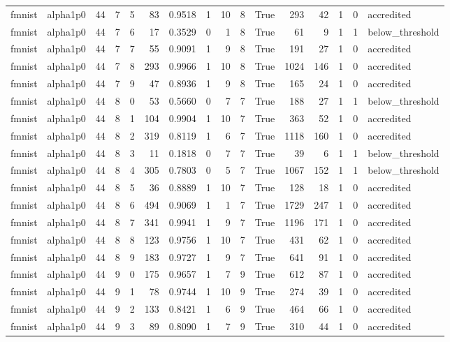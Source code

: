 \begin{tabular}{llrrrrrrrrrrrrrl}
fmnist & alpha1p0 & 44 & 7 & 5 & 83 & 0.9518 & 1 & 10 & 8 & True & 293 & 42 & 1 & 0 & accredited \\
fmnist & alpha1p0 & 44 & 7 & 6 & 17 & 0.3529 & 0 & 1 & 8 & True & 61 & 9 & 1 & 1 & below\_threshold \\
fmnist & alpha1p0 & 44 & 7 & 7 & 55 & 0.9091 & 1 & 9 & 8 & True & 191 & 27 & 1 & 0 & accredited \\
fmnist & alpha1p0 & 44 & 7 & 8 & 293 & 0.9966 & 1 & 10 & 8 & True & 1024 & 146 & 1 & 0 & accredited \\
fmnist & alpha1p0 & 44 & 7 & 9 & 47 & 0.8936 & 1 & 9 & 8 & True & 165 & 24 & 1 & 0 & accredited \\
fmnist & alpha1p0 & 44 & 8 & 0 & 53 & 0.5660 & 0 & 7 & 7 & True & 188 & 27 & 1 & 1 & below\_threshold \\
fmnist & alpha1p0 & 44 & 8 & 1 & 104 & 0.9904 & 1 & 10 & 7 & True & 363 & 52 & 1 & 0 & accredited \\
fmnist & alpha1p0 & 44 & 8 & 2 & 319 & 0.8119 & 1 & 6 & 7 & True & 1118 & 160 & 1 & 0 & accredited \\
fmnist & alpha1p0 & 44 & 8 & 3 & 11 & 0.1818 & 0 & 7 & 7 & True & 39 & 6 & 1 & 1 & below\_threshold \\
fmnist & alpha1p0 & 44 & 8 & 4 & 305 & 0.7803 & 0 & 5 & 7 & True & 1067 & 152 & 1 & 1 & below\_threshold \\
fmnist & alpha1p0 & 44 & 8 & 5 & 36 & 0.8889 & 1 & 10 & 7 & True & 128 & 18 & 1 & 0 & accredited \\
fmnist & alpha1p0 & 44 & 8 & 6 & 494 & 0.9069 & 1 & 1 & 7 & True & 1729 & 247 & 1 & 0 & accredited \\
fmnist & alpha1p0 & 44 & 8 & 7 & 341 & 0.9941 & 1 & 9 & 7 & True & 1196 & 171 & 1 & 0 & accredited \\
fmnist & alpha1p0 & 44 & 8 & 8 & 123 & 0.9756 & 1 & 10 & 7 & True & 431 & 62 & 1 & 0 & accredited \\
fmnist & alpha1p0 & 44 & 8 & 9 & 183 & 0.9727 & 1 & 9 & 7 & True & 641 & 91 & 1 & 0 & accredited \\
fmnist & alpha1p0 & 44 & 9 & 0 & 175 & 0.9657 & 1 & 7 & 9 & True & 612 & 87 & 1 & 0 & accredited \\
fmnist & alpha1p0 & 44 & 9 & 1 & 78 & 0.9744 & 1 & 10 & 9 & True & 274 & 39 & 1 & 0 & accredited \\
fmnist & alpha1p0 & 44 & 9 & 2 & 133 & 0.8421 & 1 & 6 & 9 & True & 464 & 66 & 1 & 0 & accredited \\
fmnist & alpha1p0 & 44 & 9 & 3 & 89 & 0.8090 & 1 & 7 & 9 & True & 310 & 44 & 1 & 0 & accredited \\

\end{tabular}
